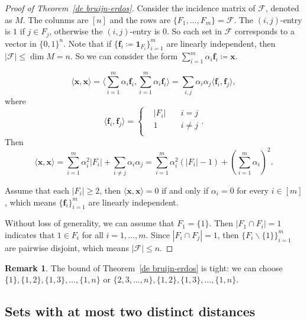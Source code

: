 \documentclass{article}
\theoremstyle{definition}
\newtheorem{remark}[theorem]{Remark}
\begin{document}
\begin{proof}[Proof of Theorem~\ref{de bruijn-erdos}]
    Consider the incidence matrix of $\mathcal{F}$, denoted as $M$. The colunms are $[n]$ and the rows are $\{ F_{1},\ldots,F_{m} \}=\mathcal{F}$. The $(i,j)$-entry is $1$ if $j\in F_{j}$, otherwise the $(i,j)$-entry is $0$. So each set in $\mathcal{F}$ corresponds to a vector in $\{ 0,1 \}^{n}$. Note that if $\{ \boldsymbol{f}_{i}\coloneqq\mathbf{1}_{F_{i}} \}_{i=1}^{m}$ are linearly independent, then $|\mathcal{F}|\leq \dim M =n$. So we can consider the form $\sum_{i=1}^{m} \alpha_{i}\boldsymbol{f}_{i}\coloneqq \boldsymbol{x}$.

    $$\langle \boldsymbol{x},\boldsymbol{x} \rangle = \Big\langle \sum_{i=1}^{m} \alpha_{i}\boldsymbol{f}_{i},\sum_{i=1}^{m} \alpha_{i}\boldsymbol{f}_{i} \Big\rangle = \sum_{i,j}\alpha_{i}\alpha_{j}\langle \boldsymbol{f}_{i},\boldsymbol{f}_{j} \rangle,$$
    where
    $$\langle \boldsymbol{f}_{i},\boldsymbol{f}_{j} \rangle = \left\{
    	\begin{aligned}
    	&|F_{i}| \quad &i=j\\
    	&1 \quad &i\neq j\\
    	\end{aligned}
    	\right
    	..
    $$
    Then
    $$\langle \boldsymbol{x},\boldsymbol{x} \rangle = \sum_{i=1}^{m}\alpha_{i}^{2}|F_{i}|+\sum_{i\neq j}\alpha_{i}\alpha_{j}=\sum_{i=1}^{m}\alpha_{i}^{2}(|F_{i}|-1)+(\sum_{i=1}^{m}\alpha_{i})^{2}.$$
    
    Assume that each $|F_{i}|\geq 2$, then $\langle \boldsymbol{x},\boldsymbol{x} \rangle=0$ if and only if $\alpha_{i}=0$ for every $i\in [m]$, which means $\{ \boldsymbol{f}_{i} \}_{i=1}^{m}$ are linearly independent.

    Without loss of generality, we can assume that $F_{1}=\{ 1 \}$. Then $|F_{1}\cap F_{i}|=1$ indicates that $1\in F_{i}$ for all $i=1,\ldots,m$. Since $|F_{i}\cap F_{j}|=1$, then $\{ F_{i}\backslash\{ 1 \} \}_{i=1}^{m}$ are pairwise disjoint, which means $|\mathcal{F}|\leq n$.
\end{proof}

\begin{remark}
    The bound of Theorem~\ref{de bruijn-erdos} is tight: we can choose $\{ 1 \},\{ 1,2 \},\{ 1,3 \},\ldots,\{ 1,n \}$ or $\{ 2,3,\ldots,n \},\{ 1,2 \},\{ 1,3 \},\ldots,\{ 1,n \}$.
\end{remark}

\subsection{Sets with at most two distinct distances}
\end{document}
